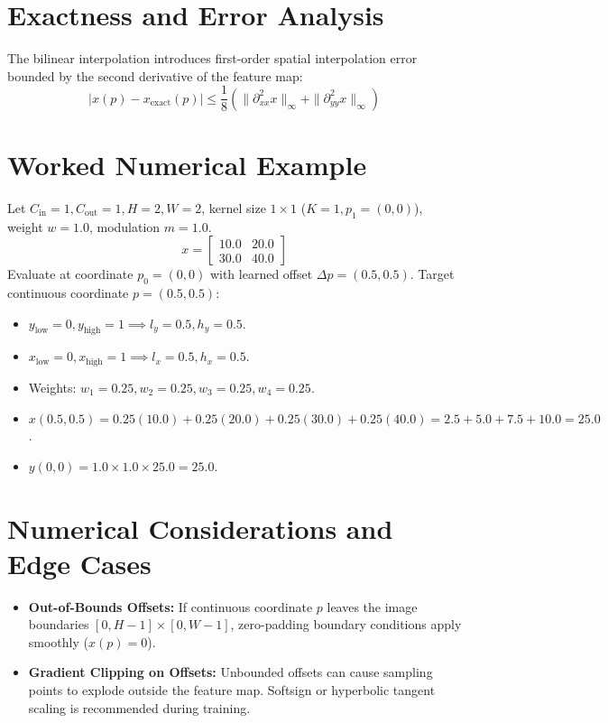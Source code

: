 \documentclass[11pt,a4paper]{article}
\theoremstyle{definition}
\begin{document}
\section{Exactness and Error Analysis}

The bilinear interpolation introduces first-order spatial interpolation error bounded by the second derivative of the feature map:
\begin{equation}
|x(p) - x_{\text{exact}}(p)| \le \frac{1}{8} \left( \|\partial_{xx}^2 x\|_{\infty} + \|\partial_{yy}^2 x\|_{\infty} \right)
\end{equation}

\section{Worked Numerical Example}

Let $C_{\text{in}}=1, C_{\text{out}}=1, H=2, W=2$, kernel size $1 \times 1$ ($K=1, p_1 = (0,0)$), weight $w = 1.0$, modulation $m = 1.0$.
\begin{equation}
x = \begin{bmatrix} 10.0 & 20.0 \\ 30.0 & 40.0 \end{bmatrix}
\end{equation}
Evaluate at coordinate $p_0 = (0, 0)$ with learned offset $\Delta p = (0.5, 0.5)$.
Target continuous coordinate $p = (0.5, 0.5)$:
\begin{itemize}
    \item $y_{\text{low}}=0, y_{\text{high}}=1 \implies l_y = 0.5, h_y = 0.5$.
    \item $x_{\text{low}}=0, x_{\text{high}}=1 \implies l_x = 0.5, h_x = 0.5$.
    \item Weights: $w_1 = 0.25, w_2 = 0.25, w_3 = 0.25, w_4 = 0.25$.
    \item $x(0.5, 0.5) = 0.25(10.0) + 0.25(20.0) + 0.25(30.0) + 0.25(40.0) = 2.5 + 5.0 + 7.5 + 10.0 = 25.0$.
    \item $y(0, 0) = 1.0 \times 1.0 \times 25.0 = 25.0$.
\end{itemize}

\section{Numerical Considerations and Edge Cases}

\begin{itemize}
    \item \textbf{Out-of-Bounds Offsets:} If continuous coordinate $p$ leaves the image boundaries $[0, H-1] \times [0, W-1]$, zero-padding boundary conditions apply smoothly ($x(p) = 0$).
    \item \textbf{Gradient Clipping on Offsets:} Unbounded offsets can cause sampling points to explode outside the feature map. Softsign or hyperbolic tangent scaling is recommended during training.
\end{itemize}
\end{document}
